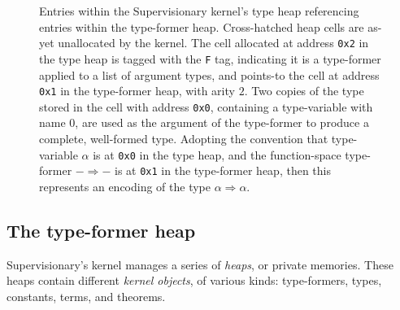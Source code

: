 \documentclass[a4paper, UKenglish, cleveref, autoref, thm-restate]{lipics-v2021}
\begin{document}
\begin{figure}
\caption{Entries within the Supervisionary kernel's type heap referencing entries within the type-former heap.
Cross-hatched heap cells are as-yet unallocated by the kernel.
The cell allocated at address \texttt{0x2} in the type heap is tagged with the \texttt{F} tag, indicating it is a type-former applied to a list of argument types, and points-to the cell at address \texttt{0x1} in the type-former heap, with arity $2$.
Two copies of the type stored in the cell with address \texttt{0x0}, containing a type-variable with name $0$, are used as the argument of the type-former to produce a complete, well-formed type.
Adopting the convention that type-variable $\alpha$ is at \texttt{0x0} in the type heap, and the function-space type-former $- \Rightarrow- $ is at \texttt{0x1} in the type-former heap, then this represents an encoding of the type $\alpha \Rightarrow \alpha$.}
\label{fig.type-former.type.heap}
\end{figure}

\subsection{The type-former heap}

Supervisionary's kernel manages a series of \emph{heaps}, or private memories.
These heaps contain different \emph{kernel objects}, of various kinds: type-formers, types, constants, terms, and theorems.
\end{document}
